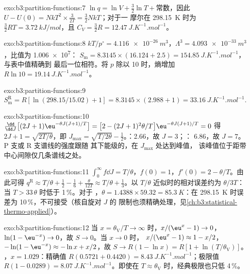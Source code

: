 \begin{solution}{exo:b3:partition-functions:7}
$\ln q = \ln V + \frac32\ln T + \text{常数}$，因此 $U - U(0) = NkT^2 \times \frac{3}{2T} = \frac32NkT$；对于一
摩尔在 \qty{298.15}{K} 时为 $\frac32RT = \qty{3.72}{kJ/mol}$，且 $C_V = \frac32R = \qty{12.47}{J.K^{-1}.mol^{-1}}$。
\end{solution}

\begin{solution}{exo:b3:partition-functions:8}
$kT/p^\circ = \qty{4.116e-26}{m^3}$，$\Lambda^3 = \qty{4.093e-33}{m^3}$，比值为 \num{1.006e7}：
$S_{\mathrm m} = 8.3145 \times (16.124 + 2.5) = \qty{154.85}{J.K^{-1}.mol^{-1}}$，与表中值精确到
最后一位相符。将 $p$ 除以 10 时，熵增加 $R\ln10 = \qty{19.14}{J.K^{-1}.mol^{-1}}$。
\end{solution}

\begin{solution}{exo:b3:partition-functions:9}
$S^{\mathrm R}_{\mathrm m} = R[\ln(298.15/15.02) + 1] = 8.3145 \times (2.988 + 1) = \qty{33.16}{J.K^{-1}.mol^{-1}}$.
\end{solution}

\begin{solution}{exo:b3:partition-functions:10}
$\frac{\dd}{\dd J}\bigl[(2J+1)\eu^{-\theta J(J+1)/T}\bigr] = \bigl[2 - (2J+1)^2\theta/T\bigr]\eu^{-\theta J(J+1)/T} = 0$ 得
$2J + 1 = \sqrt{2T/\theta}$，即 $J_{\max} = \sqrt{T/2\theta} - \frac12$。：2.66，故 $J = 3$；：
6.86，故 $J = 7$。P 支或 R 支谱线的强度跟随
其下能级的，在 $J_{\max}$ 处达到峰值，
该峰值位于距带中心间隙仅几条谱线之处。
\end{solution}

\begin{solution}{exo:b3:partition-functions:11}
$\int_0^\infty f\dd J = T/\theta$，$f(0) = 1$，$f'(0) = 2 - \theta/T$。由此可得 $q^{\mathrm R} \approx T/\theta + \frac12 -
\frac16 + \frac{\theta}{12T} \approx T/\theta + \frac13$。以 $T/\theta$ 近似时的相对误差约为 $\theta/3T$：
当 $T > 33\,\theta$ 时低于 1\,\%。对于 ，$\theta = 1.4388 \times 59.32 = \qty{85.3}{K}$：在
\qty{298.15}{K} 时误差为 10\,\%，不可接受（核自旋对 $J$ 的
限制也须精确处理，见\cref{ch:b3:statistical-thermo-applied}）。
\end{solution}

\begin{solution}{exo:b3:partition-functions:12}
当 $x = \theta_{\mathrm V}/T \to \infty$ 时，$x/(\eu^x - 1) \to 0$，$\ln(1 - \eu^{-x}) \to 0$，故 $S \to 0$。当 $x \to 0$ 时，
$x/(\eu^x - 1) \approx 1 - x/2$，$-\ln(1 - \eu^{-x}) \approx -\ln x + x/2$，故 $S \to R(1 - \ln x) = R[1 + \ln(T/\theta_{\mathrm V})]$。
，$x = 1.029$：精确值 $R(0.5721 + 0.4420) = \qty{8.43}{J.K^{-1}.mol^{-1}}$；极限值 $R(1 - 0.0289) =
\qty{8.07}{J.K^{-1}.mol^{-1}}$。即使在 $T \approx \theta_{\mathrm V}$ 时，经典极限也只低 4\,\%。
\end{solution}

